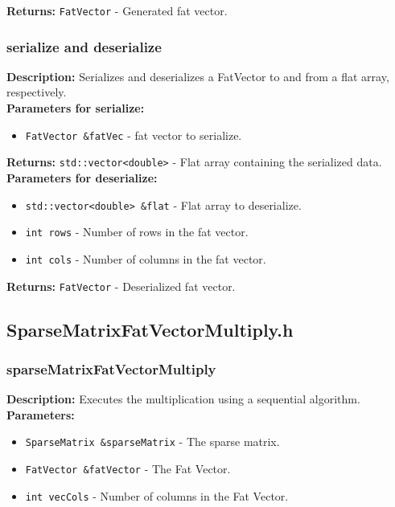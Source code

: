 \documentclass[12pt,oneside]{book} %
\begin{document}
\begin{subappendices}
    \textbf{Returns:} \texttt{FatVector} - Generated fat vector.

    \subsubsection{serialize and deserialize}
    \textbf{Description:} Serializes and deserializes a FatVector to and from a flat array, respectively.\\

    \textbf{Parameters for serialize:}
    \begin{itemize}
        \item \texttt{FatVector \&fatVec} - fat vector to serialize.
    \end{itemize}

    \textbf{Returns:} \texttt{std::vector<double>} - Flat array containing the serialized data.\\

    \textbf{Parameters for deserialize:}
    \begin{itemize}
        \item \texttt{std::vector<double> \&flat} - Flat array to deserialize.
        \item \texttt{int rows} - Number of rows in the fat vector.
        \item \texttt{int cols} - Number of columns in the fat vector.
    \end{itemize}

    \textbf{Returns:} \texttt{FatVector} - Deserialized fat vector.

    \subsection{SparseMatrixFatVectorMultiply.h}
    \subsubsection{sparseMatrixFatVectorMultiply}
    \textbf{Description:} Executes the multiplication using a sequential algorithm.\\

    \textbf{Parameters:}
    \begin{itemize}
        \item \texttt{SparseMatrix \&sparseMatrix} - The sparse matrix.
        \item \texttt{FatVector \&fatVector} - The Fat Vector.
        \item \texttt{int vecCols} - Number of columns in the Fat Vector.
    \end{itemize}


\end{subappendices}
\end{document}
